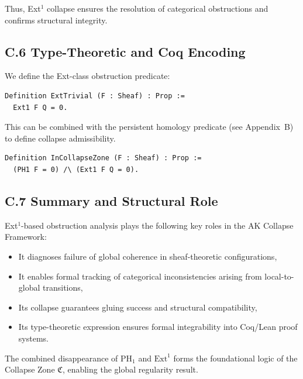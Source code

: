 \documentclass[11pt]{article}
\begin{document}
Thus, Ext$^1$ collapse ensures the resolution of categorical obstructions and confirms structural integrity.

\subsection{C.6 Type-Theoretic and Coq Encoding}

We define the Ext-class obstruction predicate:

\begin{lstlisting}[language=Coq, caption=Ext-Class Obstruction Predicate]
Definition ExtTrivial (F : Sheaf) : Prop :=
  Ext1 F Q = 0.
\end{lstlisting}

This can be combined with the persistent homology predicate (see Appendix~B) to define collapse admissibility.

\begin{lstlisting}[language=Coq, caption=Combined Collapse Zone Predicate]
Definition InCollapseZone (F : Sheaf) : Prop :=
  (PH1 F = 0) /\ (Ext1 F Q = 0).
\end{lstlisting}

\subsection{C.7 Summary and Structural Role}

Ext$^1$-based obstruction analysis plays the following key roles in the AK Collapse Framework:

\begin{itemize}
  \item It diagnoses failure of global coherence in sheaf-theoretic configurations,
  \item It enables formal tracking of categorical inconsistencies arising from local-to-global transitions,
  \item Its collapse guarantees gluing success and structural compatibility,
  \item Its type-theoretic expression ensures formal integrability into Coq/Lean proof systems.
\end{itemize}

The combined disappearance of $\mathrm{PH}_1$ and $\mathrm{Ext}^1$ forms the foundational logic of the Collapse Zone $\mathfrak{C}$, enabling the global regularity result.



\end{document}
